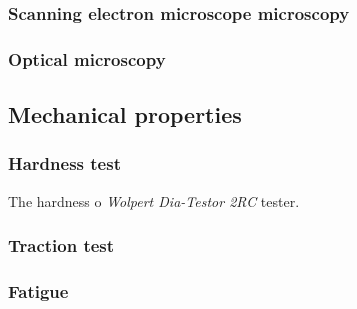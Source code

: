 \subsubsection{Scanning electron microscope microscopy}

\subsubsection{Optical microscopy}

\subsection{Mechanical properties}

\subsubsection{Hardness test}

The hardness o  \textit{Wolpert Dia-Testor 2RC} tester.

\subsubsection{Traction test}

\subsubsection{Fatigue}
